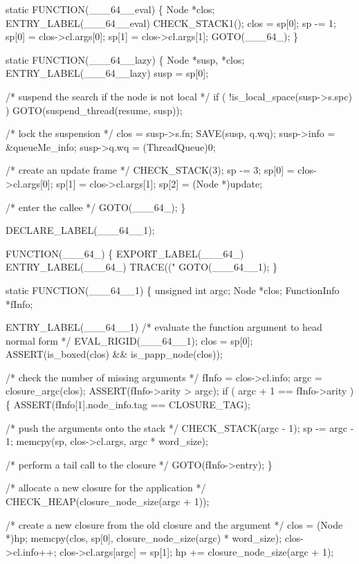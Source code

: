 static
FUNCTION(___64__eval)
\{
    Node *clos;
 ENTRY_LABEL(___64__eval)
    CHECK_STACK1();
    clos  = sp[0];
    sp   -= 1;
    sp[0] = clos->cl.args[0];
    sp[1] = clos->cl.args[1];
    GOTO(___64_);
\}

static
FUNCTION(___64__lazy)
\{
    Node *susp, *clos;
 ENTRY_LABEL(___64__lazy)
    susp = sp[0];

    /* suspend the search if the node is not local */
    if ( !is_local_space(susp->s.spc) )
        GOTO(suspend_thread(resume, susp));

    /* lock the suspension */
    clos = susp->s.fn;
    SAVE(susp, q.wq);
    susp->info = &queueMe_info;
    susp->q.wq = (ThreadQueue)0;

    /* create an update frame */
    CHECK_STACK(3);
    sp   -= 3;
    sp[0] = clos->cl.args[0];
    sp[1] = clos->cl.args[1];
    sp[2] = (Node *)update;

    /* enter the callee */
    GOTO(___64_);
\}

DECLARE_LABEL(___64__1);

FUNCTION(___64_)
\{
    EXPORT_LABEL(___64_)
 ENTRY_LABEL(___64_)
    TRACE(("%
    GOTO(___64__1);
\}

static
FUNCTION(___64__1)
\{
    unsigned int argc;
    Node         *clos;
    FunctionInfo *fInfo;

 ENTRY_LABEL(___64__1)
    /* evaluate the function argument to head normal form */
    EVAL_RIGID(___64__1);
    clos = sp[0];
    ASSERT(is_boxed(clos) && is_papp_node(clos));

    /* check the number of missing arguments */
    fInfo = clos->cl.info;
    argc  = closure_argc(clos);
    ASSERT(fInfo->arity > argc);
    if ( argc + 1 == fInfo->arity )
    \{
        ASSERT(fInfo[1].node_info.tag == CLOSURE_TAG);

        /* push the arguments onto the stack */
        CHECK_STACK(argc - 1);
        sp -= argc - 1;
        memcpy(sp, clos->cl.args, argc * word_size);

        /* perform a tail call to the closure */
        GOTO(fInfo->entry);
    \}

    /* allocate a new closure for the application */
    CHECK_HEAP(closure_node_size(argc + 1));

    /* create a new closure from the old closure and the argument */
    clos = (Node *)hp;
    memcpy(clos, sp[0], closure_node_size(argc) * word_size);
    clos->cl.info++;
    clos->cl.args[argc] = sp[1];
    hp += closure_node_size(argc + 1);

